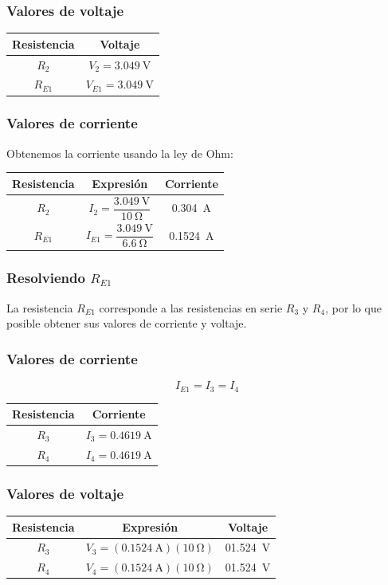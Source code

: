 \documentclass[14pt]{beamer}
\begin{document}
\begin{frame}
\frametitle{Valores de voltaje}
\begin{table}[H]
\centering
\begin{tabular}{c | c }
Resistencia & Voltaje \\ \hline
$R_{2}$ & $V_{2} = \SI{3.049}{\volt}$ \\ \hline
$R_{E1}$ & $V_{E1} = \SI{3.049}{\volt}$ \\ \hline
\end{tabular}
\end{table}    
\end{frame}
\begin{frame}
\frametitle{Valores de corriente}
Obtenemos la corriente usando la ley de Ohm:
\begin{table}[H]
\centering
\begin{tabular}{c | c | c}
Resistencia & Expresión & Corriente \\ \hline
$R_{2}$ & $I_{2} = \dfrac{\SI{3.049}{\volt}}{\SI{10}{\ohm}}$ & \SI{0.304}{\ampere} \\ \hline
$R_{E1}$ & $I_{E1} = \dfrac{\SI{3.049}{\volt}}{\SI{6.6}{\ohm}}$ & \SI{0.1524}{\ampere} \\ \hline
\end{tabular}
\end{table}    
\end{frame}
\begin{frame}
\frametitle{Resolviendo $R_{E1}$}
La resistencia $R_{E1}$ corresponde a las resistencias en serie $R_{3}$ y $R_{4}$, por lo que posible obtener sus valores de corriente y voltaje.
\end{frame}
\begin{frame}
\frametitle{Valores de corriente}
\vspace*{-1cm}
\[ I_{E1} = I_{3} = I_{4} \]
\begin{table}[H]
\centering
\begin{tabular}{c | c }
Resistencia & Corriente \\ \hline
$R_{3}$ & $I_{3} = \SI{0.4619}{\ampere}$ \\ \hline
$R_{4}$ & $I_{4} = \SI{0.4619}{\ampere}$ \\ \hline
\end{tabular}
\end{table}    
\end{frame}
\begin{frame}
\frametitle{Valores de voltaje}
\begin{table}[H]
\centering
\begin{tabular}{c | c | c}
Resistencia & Expresión & Voltaje \\ \hline
$R_{3}$ & $V_{3} = (\SI{0.1524}{\ampere})(\SI{10}{\ohm})$ & \SI{01.524}{\volt} \\ \hline
$R_{4}$ & $V_{4} = (\SI{0.1524}{\ampere})(\SI{10}{\ohm})$ & \SI{01.524}{\volt} \\ \hline
\end{tabular}
\end{table}    
\end{frame}
\end{document}
